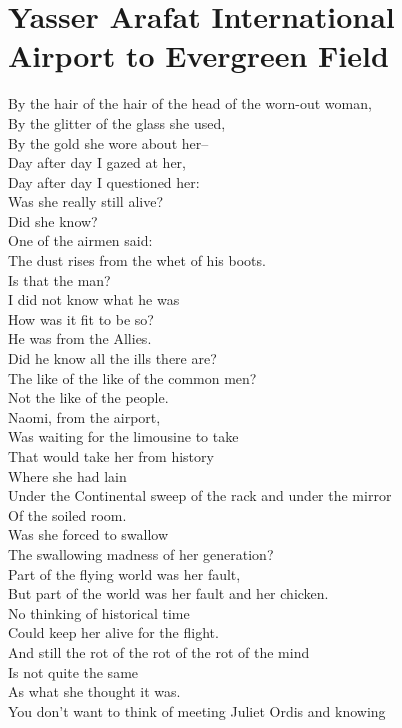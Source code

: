 \documentclass[smalldemyvopaper,11pt,twoside,onecolumn,openright,extrafontsizes]{memoir}
\begin{document}
\chapter{Yasser Arafat International Airport to Evergreen Field}
By the hair of the hair of the head of the worn-out woman,
\\By the glitter of the glass she used,
\\By the gold she wore about her--
\\Day after day I gazed at her,
\\Day after day I questioned her:
\\Was she really still alive?
\\Did she know?
\\One of the airmen said:
\\The dust rises from the whet of his boots.
\\Is that the man?
\\I did not know what he was
\\How was it fit to be so?
\\He was from the Allies.
\\Did he know all the ills there are?
\\The like of the like of the common men?
\\Not the like of the people.
\\Naomi, from the airport,
\\Was waiting for the limousine to take
\\That would take her from history
\\Where she had lain
\\Under the Continental sweep of the rack and under the mirror
\\Of the soiled room.
\\Was she forced to swallow
\\The swallowing madness of her generation?
\\Part of the flying world was her fault,
\\But part of the world was her fault and her chicken.
\\No thinking of historical time
\\Could keep her alive for the flight.
\\And still the rot of the rot of the rot of the mind
\\Is not quite the same
\\As what she thought it was.
\\You don't want to think of meeting Juliet Ordis and knowing
\end{document}
